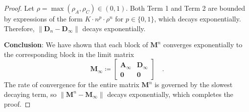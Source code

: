 \documentclass[../../main.tex]{subfiles}
\begin{document}
\begin{proof}
    Let $\rho = \max(\rho_A, \rho_C) \in (0,1)$. Both Term 1 and Term 2 are bounded by expressions of the form $K \cdot n^p \cdot \rho^n$ for $p \in \{0, 1\}$, which decays exponentially. Therefore, $\|\bm{D}_n - \bm{D}_\infty\|$ decays exponentially.

    \textbf{Conclusion}:
    We have shown that each block of $\bm{M}^n$ converges exponentially to the corresponding block in the limit matrix
    \[
        \bm{M}_\infty \coloneqq \begin{bmatrix}
        \bm{A}_\infty & \bm{D}_\infty \\
        \bm{0} & \bm{0}
        \end{bmatrix} \quad .
    \]
    The rate of convergence for the entire matrix $\bm{M}^n$ is governed by the slowest decaying term, so $\|\bm{M}^n - \bm{M}_\infty\|$ decays exponentially, which completes the proof.
\end{proof}
\end{document}
